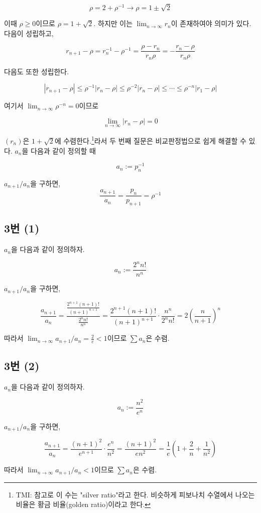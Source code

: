 \[
\rho=2+\rho^{-1} \longrightarrow \rho=1\pm\sqrt{2}
\]

이때 $\rho\geq0$이므로 $\rho=1+\sqrt{2}$. 하지만 이는 $\lim_{n\to\infty}r_n$이 존재하여야 의미가 있다. 다음이 성립하고,

\[
r_{n+1}-\rho=r_n^{-1}-\rho^{-1}=\frac{\rho-r_n}{r_n\rho}=-\frac{r_n-\rho}{r_n\rho}
\]

다음도 또한 성립한다.

\[
|r_{n+1}-\rho|\leq\rho^{-1}|r_n-\rho|\leq\rho^{-2}|r_n-\rho|\leq\cdots\leq\rho^{-n}|r_1-\rho|
\]

여기서 $\lim_{n\to\infty}\rho^{-n}=0$이므로

\[
\lim_{n\to\infty}|r_n-\rho|=0
\]

$(r_n)$은 $1+\sqrt{2}$에 수렴한다.\footnote{TMI: 참고로 이 수는 "silver ratio"라고 한다. 비슷하게 피보나치 수열에서 나오는 비율은 황금 비율(golden ratio)이라고 한다.}라서 두 번째 질문은 비교판정법으로 쉽게 해결할 수 있다. $a_n$을 다음과 같이 정의할 때

\[
a_n:=p_n^{-1}
\]

$a_{n+1}/a_n$을 구하면,
\[
\frac{a_{n+1}}{a_n}=\frac{p_n}{p_{n+1}}=\rho^{-1}
\]

\subsection{3번 (1)}
$a_n$을 다음과 같이 정의하자.

\[
a_n:=\frac{2^{n}n!}{n^n}
\]

$a_{n+1}/a_n$을 구하면,

\[
\frac{a_{n+1}}{a_n}=\frac{\frac{2^{n+1}(n+1)!}{(n+1)^{n+1}}}{\frac{2^{n}n!}{n^n}}=\frac{2^{n+1}(n+1)!}{(n+1)^{n+1}}\cdot\frac{n^n}{2^{n}n!}=2\left(\frac{n}{n+1}\right)^n
\]

따라서 $\lim_{n\to\infty}a_{n+1}/a_n=\frac{2}{e}<1$이므로 $\sum a_n$은 수렴.

\subsection{3번 (2)}
$a_n$을 다음과 같이 정의하자.

\[
a_n:=\frac{n^2}{e^n}
\]

$a_{n+1}/a_n$을 구하면,

\[
\frac{a_{n+1}}{a_n}=\frac{(n+1)^2}{e^{n+1}}\cdot\frac{e^n}{n^2}=\frac{(n+1)^2}{en^2}=\frac{1}{e}\left(1+\frac{2}{n}+\frac{1}{n^2}\right)
\]

따라서 $\lim_{n\to\infty}a_{n+1}/a_n<1$이므로 $\sum a_n$은 수렴.

